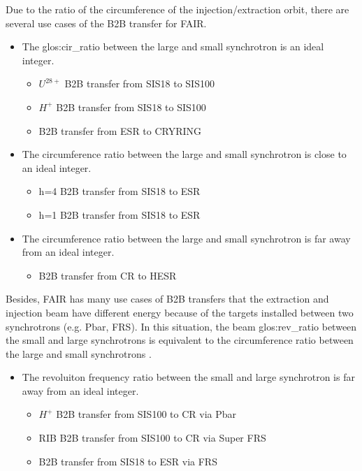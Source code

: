 Due to the ratio of the circumference of the injection/extraction orbit, there are several use cases of the B2B transfer for FAIR. 
\begin{itemize}
	\item The \gls{glos:cir_ratio} between the large and small synchrotron is an ideal integer.
		\begin{itemize}
			\item	$U^{28+}$ B2B transfer from SIS18 to SIS100
			\item $H^{+}$ B2B transfer from SIS18 to SIS100
			\item B2B transfer from ESR to CRYRING
		\end{itemize}
	\item The circumference ratio between the large and small synchrotron is close to an ideal integer.
		\begin{itemize}
			\item h=4 B2B transfer from SIS18 to ESR
			\item h=1 B2B transfer from SIS18 to ESR
		\end{itemize}
 	\item The circumference ratio between the large and small synchrotron is far away from an ideal integer.
		\begin{itemize}
			\item B2B transfer from CR to HESR
		\end{itemize}
\end{itemize}
Besides, FAIR has many use cases of B2B transfers that the extraction and injection beam have different energy because of the targets installed between two synchrotrons (e.g. Pbar, FRS). In this situation, the beam \gls{glos:rev_ratio} between the small and large synchrotrons is equivalent to the circumference ratio between the large and small synchrotrons . 

\begin{itemize}

 	\item The revoluiton frequency ratio between the small and large synchrotron is far away from an ideal integer.
		\begin{itemize}
			\item $H^{+}$ B2B transfer from SIS100 to CR via Pbar
			\item RIB B2B transfer from SIS100 to CR via Super FRS
			\item B2B transfer from SIS18 to ESR via FRS
		\end{itemize}
\end{itemize}
  
